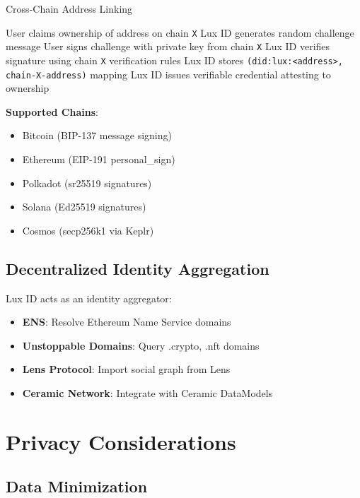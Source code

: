 \documentclass[11pt,a4paper]{article}
\begin{document}
\begin{algorithm}
\caption{Cross-Chain Address Linking}
\begin{algorithmic}[1]
\State User claims ownership of address on chain \texttt{X}
\State Lux ID generates random challenge message
\State User signs challenge with private key from chain \texttt{X}
\State Lux ID verifies signature using chain \texttt{X} verification rules
\State Lux ID stores \texttt{(did:lux:<address>, chain-X-address)} mapping
\State Lux ID issues verifiable credential attesting to ownership
\end{algorithmic}
\end{algorithm}

\textbf{Supported Chains}:
\begin{itemize}
  \item Bitcoin (BIP-137 message signing)
  \item Ethereum (EIP-191 personal\_sign)
  \item Polkadot (sr25519 signatures)
  \item Solana (Ed25519 signatures)
  \item Cosmos (secp256k1 via Keplr)
\end{itemize}

\subsection{Decentralized Identity Aggregation}

Lux ID acts as an identity aggregator:
\begin{itemize}
  \item \textbf{ENS}: Resolve Ethereum Name Service domains
  \item \textbf{Unstoppable Domains}: Query .crypto, .nft domains
  \item \textbf{Lens Protocol}: Import social graph from Lens
  \item \textbf{Ceramic Network}: Integrate with Ceramic DataModels
\end{itemize}

\section{Privacy Considerations}

\subsection{Data Minimization}
\end{document}
